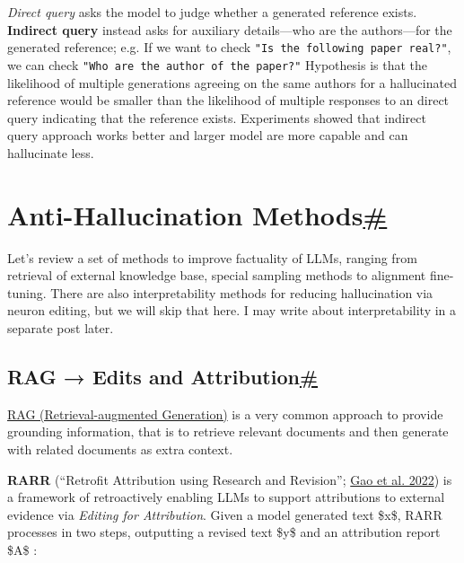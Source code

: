 \emph{Direct query} asks the model to judge whether a generated reference exists. \textbf{Indirect query} instead asks for auxiliary details---who are the authors---for the generated reference; e.g. If we want to check \texttt{"Is\ the\ following\ paper\ real?"}, we can check \texttt{"Who\ are\ the\ author\ of\ the\ paper?"} Hypothesis is that the likelihood of multiple generations agreeing on the same authors for a hallucinated reference would be smaller than the likelihood of multiple responses to an direct query indicating that the reference exists. Experiments showed that indirect query approach works better and larger model are more capable and can hallucinate less.

\section{\texorpdfstring{Anti-Hallucination Methods\hyperref[anti-hallucination-methods]{\#}}{Anti-Hallucination Methods\#}}\label{anti-hallucination-methods}

Let's review a set of methods to improve factuality of LLMs, ranging from retrieval of external knowledge base, special sampling methods to alignment fine-tuning. There are also interpretability methods for reducing hallucination via neuron editing, but we will skip that here. I may write about interpretability in a separate post later.

\subsection{\texorpdfstring{RAG → Edits and Attribution\hyperref[rag--edits-and-attribution]{\#}}{RAG → Edits and Attribution\#}}\label{rag--edits-and-attribution}

\href{https://lilianweng.github.io/posts/2020-10-29-odqa/\#RAG}{RAG (Retrieval-augmented Generation)} is a very common approach to provide grounding information, that is to retrieve relevant documents and then generate with related documents as extra context.

\textbf{RARR} (``Retrofit Attribution using Research and Revision''; \href{https://arxiv.org/abs/2210.08726}{Gao et al. 2022}) is a framework of retroactively enabling LLMs to support attributions to external evidence via \emph{Editing for Attribution}. Given a model generated text \$x\$, RARR processes in two steps, outputting a revised text \$y\$ and an attribution report \$A\$ :

